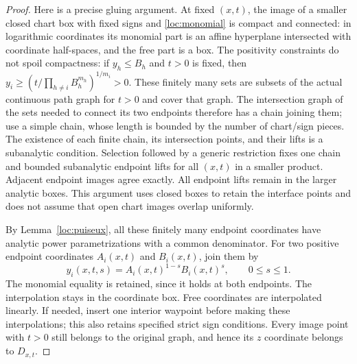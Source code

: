 \begin{proof}
Here is a precise gluing argument.  At fixed $(x,t)$, the image of a
smaller closed chart box with fixed signs and
\eqref{loc:monomial} is compact and connected: in logarithmic
coordinates its monomial part is an affine hyperplane intersected
with coordinate half-spaces, and the free part is a box.
The positivity constraints do not spoil compactness: if $y_h\leq B_h$
and $t>0$ is fixed, then
$y_i\geq(t/\prod_{h\ne i}B_h^{m_h})^{1/m_i}>0$.
These finitely many sets are subsets of the actual continuous path
graph for $t>0$ and cover that graph.  The
intersection graph of the sets needed to connect its two endpoints
therefore has a chain joining them; use a simple chain, whose length
is bounded by the number of chart/sign pieces.  The existence of
each finite chain, its intersection points, and their lifts is a
subanalytic condition.  Selection followed by a generic restriction
fixes one chain and bounded subanalytic endpoint lifts for all
$(x,t)$ in a smaller product.  Adjacent endpoint images agree exactly.
All endpoint lifts remain in the larger analytic boxes.  This argument
uses closed boxes to retain the interface points and does not assume
that open chart images overlap uniformly.

By Lemma~\ref{loc:puiseux}, all these finitely many endpoint
coordinates have analytic power parametrizations with a common
denominator.  For two positive endpoint coordinates $A_i(x,t)$ and
$B_i(x,t)$, join them by
\[
 y_i(x,t,s)=A_i(x,t)^{1-s}B_i(x,t)^s,
                   \qquad 0\leq s\leq1.
\]
The monomial equality is retained, since it holds at both endpoints.
The interpolation stays in the coordinate box.  Free coordinates are
interpolated linearly.  If needed, insert one interior waypoint before
making these interpolations; this also retains specified strict sign
conditions.  Every image point with $t>0$ still belongs to the original
graph, and hence its $z$ coordinate belongs to $D_{x,t}$.


\end{proof}
